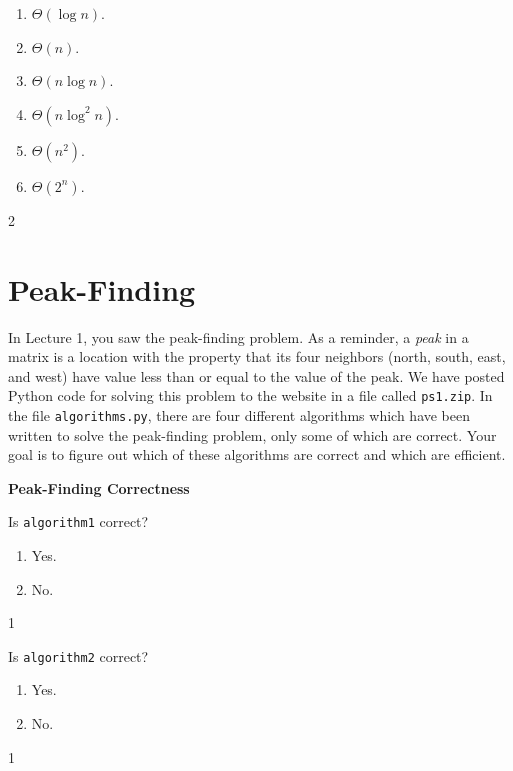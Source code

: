\documentclass[12pt,twoside]{article}
\begin{document}
\begin{problems}
\begin{problemparts}
\begin{enumerate}
\item $\Theta(\log n)$.
\item $\Theta(n)$.
\item $\Theta(n \log n)$.
\item $\Theta(n \log^2 n)$.
\item $\Theta(n^2)$.
\item $\Theta(2^n)$.
\end{enumerate}

\ifsolution \solution{}
2
\fi

\end{problemparts}

\section*{Peak-Finding}

In Lecture 1,
you saw the peak-finding problem.
As a reminder,
a \emph{peak} in a matrix
is a location with the property that its four neighbors
(north, south, east, and west)
have value less than or equal to the value of the peak.
We have posted Python code for solving this problem
to the website in a file called \texttt{ps1.zip}.
In the file \texttt{algorithms.py},
there are four different algorithms
which have been written
to solve the peak-finding problem,
only some of which are correct.
Your goal is to figure out
which of these algorithms are correct
and which are efficient.

\problem {} \textbf{Peak-Finding Correctness}

\begin{problemparts}

\problempart {} Is \texttt{algorithm1} correct?
\begin{enumerate}
\item Yes.
\item No.
\end{enumerate}

\ifsolution \solution{}
1
\fi

\problempart {} Is \texttt{algorithm2} correct?
\begin{enumerate}
\item Yes.
\item No.
\end{enumerate}

\ifsolution \solution{}
1
\fi


\end{problemparts}
\end{problems}
\end{document}
